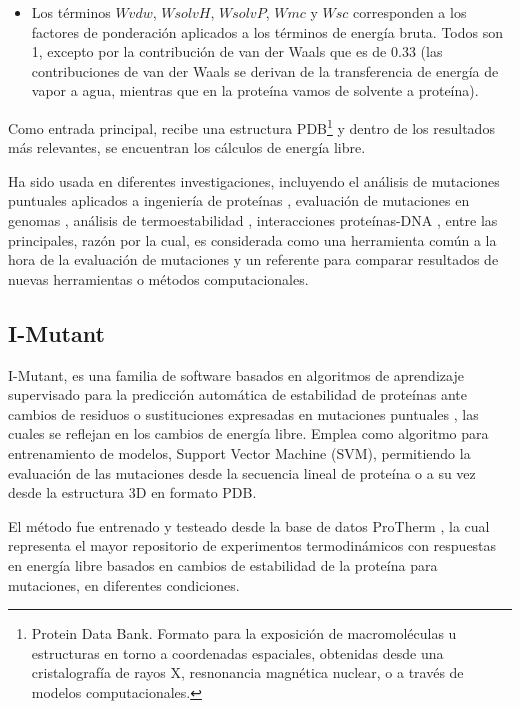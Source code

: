 \begin{itemize}
	\item Los términos $Wvdw$, $WsolvH$, $WsolvP$, $Wmc$ y $Wsc$ corresponden a los factores de ponderación aplicados a los términos de energía bruta. Todos son 1, excepto por la contribución de van der Waals que es de 0.33 (las contribuciones de van der Waals se derivan de la transferencia de energía de vapor a agua, mientras que en la proteína vamos de solvente a proteína).
	
\end{itemize}

Como entrada principal, recibe una estructura PDB\footnote{Protein Data Bank. Formato para la exposición de macromoléculas u estructuras en torno a coordenadas espaciales, obtenidas desde una cristalografía de rayos X, resnonancia magnética nuclear, o a través de modelos computacionales.} y dentro de los resultados más relevantes, se encuentran los cálculos de energía libre.

Ha sido usada en diferentes investigaciones, incluyendo el análisis de mutaciones puntuales aplicados a ingeniería de proteínas \cite{BU201825, Alibes2010}, evaluación de mutaciones en genomas \cite{Sanchez2008}, análisis de termoestabilidad \cite{Bu2018, 10.1093/protein/gzv004}, interacciones proteínas-DNA \cite{NADRA20113}, entre las principales, razón por la cual, es considerada como una herramienta común a la hora de la evaluación de mutaciones y un referente para comparar resultados de nuevas herramientas o métodos computacionales.

\subsection{I-Mutant}

I-Mutant, es una familia de software basados en algoritmos de aprendizaje supervisado para la predicción automática de estabilidad de proteínas ante cambios de residuos o sustituciones expresadas en mutaciones puntuales \cite{capriotti2005mutant2}, las cuales se reflejan en los cambios de energía libre. Emplea como algoritmo para entrenamiento de modelos, Support Vector Machine (SVM), permitiendo la evaluación de las mutaciones desde la secuencia lineal de proteína o a su vez desde la estructura 3D en formato PDB.

El método fue entrenado y testeado desde la base de datos ProTherm \cite{Bava2004}, la cual representa el mayor repositorio de experimentos termodinámicos con respuestas en energía libre basados en cambios de estabilidad de la proteína para mutaciones, en diferentes condiciones. 

